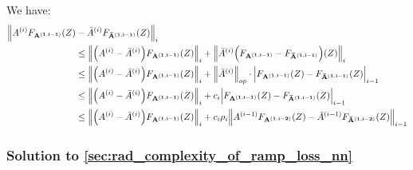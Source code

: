 \begin{proof*}
    \noindent We have:
    \begin{align*}
        \Big\|
            A^{(i)}F_{\bf A^{(1, i-1)}}(Z) &- {\bar A}^{(i)}F_{\bf {\bar A}^{(1, i-1)}}(Z)
        \Big\|_i \\
            &\le \Big\|\Big( A^{(i)} - {\bar A}^{(i)} \Big)F_{\bf A^{(1, i-1)}}(Z) \Big\|_i + \Big\| {\bar A}^{(i)}\Big( F_{\bf A^{(1, i-1)}} - F_{\bf {\bar A}^{(1, i-1)}} \Big)(Z)\Big\|_i \\
            &\le \Big\|\Big( A^{(i)} - {\bar A}^{(i)} \Big)F_{\bf A^{(1, i-1)}}(Z) \Big\|_i + \Big\|{\bar A}^{(i)}\Big\|_{op} \cdot\Big| F_{\bf A^{(1, i-1)}}(Z) - F_{\bf {\bar A}^{(1, i-1)}}(Z) \Big|_{i-1} \\
            &\le \Big\|\Big( A^{(i)} - {\bar A}^{(i)} \Big)F_{\bf A^{(1, i-1)}}(Z) \Big\|_i + c_i\Big| F_{\bf A^{(1, i-1)}}(Z) - F_{\bf {\bar A}^{(1, i-1)}}(Z) \Big|_{i-1} \\
            &\le \Big\|\Big( A^{(i)} - {\bar A}^{(i)} \Big)F_{\bf A^{(1, i-1)}}(Z) \Big\|_i + c_i\rho_i\Big\| A^{(i-1)}F_{\bf A^{(1, i-2)}}(Z) - {\bar A}^{(i-1)}F_{\bf {\bar A}^{(1, i-2)}}(Z) \Big\|_{i-1} 
    \end{align*}
\end{proof*}


\subsubsection{Solution to \ref{sec:rad_complexity_of_ramp_loss_nn}}

